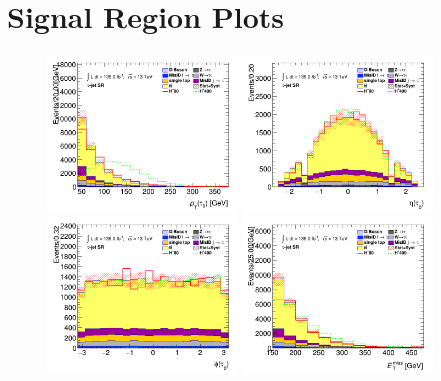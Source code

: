 	\section{\taujets Signal Region Plots}\label{sec:taujet-sr-plots}
		\clearpage
		\begin{figure}[!htp]
			\begin{center}    
			\includegraphics[width=0.45\textwidth]{chapters/chapter6_HPlus/images/taujets/tau_0_pt_SR_TAUJET.png}
			\includegraphics[width=0.45\textwidth]{chapters/chapter6_HPlus/images/taujets/tau_0_eta_SR_TAUJET.png} \\
			\includegraphics[width=0.45\textwidth]{chapters/chapter6_HPlus/images/taujets/tau_0_phi_SR_TAUJET.png}
			\includegraphics[width=0.45\textwidth]{chapters/chapter6_HPlus/images/taujets/met_et_SR_TAUJET.png} \\

\end{center}
\end{figure}
